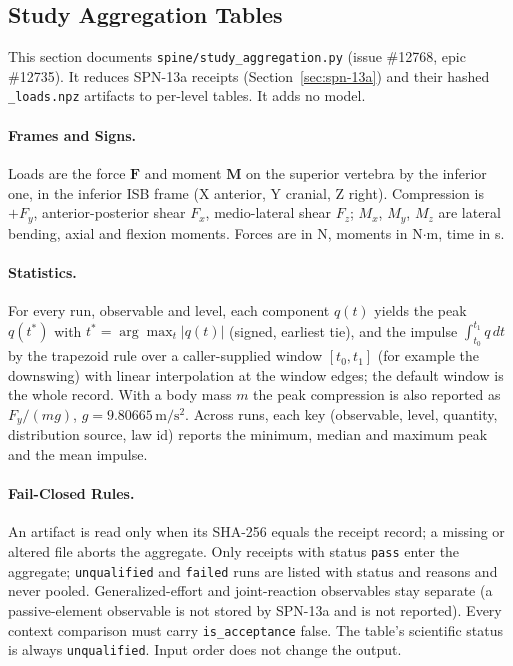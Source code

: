 \subsection{Study Aggregation Tables}
\label{sec:spn-13c}

This section documents \texttt{spine/study\_aggregation.py} (issue \#12768,
epic \#12735). It reduces SPN-13a receipts (Section~\ref{sec:spn-13a}) and their
hashed \texttt{\_loads.npz} artifacts to per-level tables. It adds no model.

\paragraph{Frames and Signs.}
Loads are the force $\mathbf F$ and moment $\mathbf M$ on the superior vertebra
by the inferior one, in the inferior ISB frame (X anterior, Y cranial, Z right).
Compression is $+F_y$, anterior-posterior shear $F_x$, medio-lateral shear
$F_z$; $M_x$, $M_y$, $M_z$ are lateral bending, axial and flexion moments.
Forces are in N, moments in N$\cdot$m, time in s.

\paragraph{Statistics.}
For every run, observable and level, each component $q(t)$ yields the peak
$q(t^\ast)$ with $t^\ast=\arg\max_t |q(t)|$ (signed, earliest tie), and the
impulse $\int_{t_0}^{t_1} q\,dt$ by the trapezoid rule over a caller-supplied
window $[t_0,t_1]$ (for example the downswing) with linear interpolation at the
window edges; the default window is the whole record. With a body mass $m$ the
peak compression is also reported as $F_y/(m g)$, $g=9.80665\,\mathrm{m/s^2}$.
Across runs, each key (observable, level, quantity, distribution source, law
id) reports the minimum, median and maximum peak and the mean impulse.

\paragraph{Fail-Closed Rules.}
An artifact is read only when its SHA-256 equals the receipt record; a missing
or altered file aborts the aggregate. Only receipts with status \texttt{pass}
enter the aggregate; \texttt{unqualified} and \texttt{failed} runs are listed
with status and reasons and never pooled. Generalized-effort and joint-reaction
observables stay separate (a passive-element observable is not stored by
SPN-13a and is not reported). Every context comparison must carry
\texttt{is\_acceptance} false. The table's scientific status is always
\texttt{unqualified}. Input order does not change the output.

